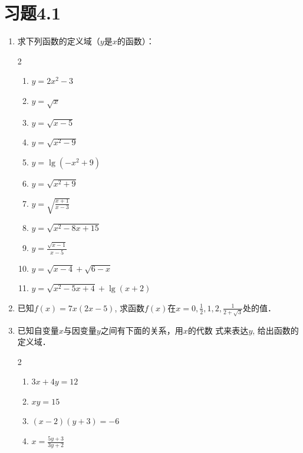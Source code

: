 \section*{习题4.1}
\begin{enumerate}
    \item     求下列函数的定义域（$y$是$x$的函数）：
    \begin{multicols}{2}
\begin{enumerate}
    \item $y=2x^2-3$
    \item $y=\sqrt{x}$
    \item $y=\sqrt{x-5}$
    \item $y=\sqrt{x^2-9}$
    \item $y=\lg(-x^2+9)$
    \item $y=\sqrt{x^2+9}$
    \item $y=\sqrt{\frac{x+1}{x-3}}$
    \item $y=\sqrt{x^2-8x+15}$
    \item $y=\frac{\sqrt{x-1}}{x-5}$
    \item $y=\sqrt{x-4}+\sqrt{6-x}$
    \item $y=\sqrt{x^2-5x+4}+\lg(x+2)$

\end{enumerate}        
    \end{multicols}

\item 已知$f(x)=7x(2x-5)$, 求函数$f(x)$在$x=0,\frac{1}{2},1,2,
    \frac{1}{2+\sqrt{3}}$处的值．
    
\item 已知自变量$x$与因变量$y$之间有下面的关系，用$x$的代数
    式来表达$y$, 给出函数的定义域．
\begin{multicols}{2}
\begin{enumerate}
    \item $3x+4y=12$
    \item $xy=15$
    \item $(x-2)(y+3)=-6$
    \item $x=\frac{5y+3}{3y+2}$
\end{enumerate}
\end{multicols}


\end{enumerate}
